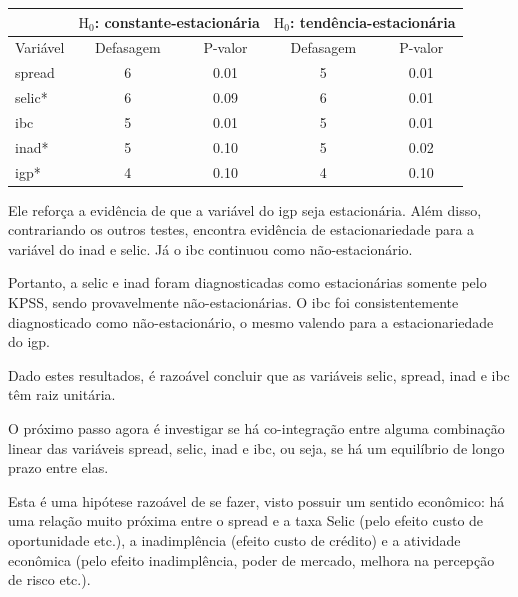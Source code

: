 \documentclass[a4paper,
               article,
               12pt,
               openany,
               oneside,
               english,
               brazil]{abntex2}
\numberwithin{equation}{section}
\begin{document}
    \begin{table}[ht]
        {%
            \begin{tabular}{lcccc}
                \midrule
                & \multicolumn{2}{C{5cm}}{$ \text{H}_0 $: constante-estacionária} & \multicolumn{2}{C{5cm}}{$ \text{H}_0 $: tendência-estacionária} \\
                \midrule
                Variável & Defasagem & P-valor & Defasagem & P-valor \\
                \midrule
                spread     &          6 &     0.01 &          5 &     0.01 \\
                selic*      &          6 &     0.09 &          6 &     0.01 \\
                ibc        &          5 &     0.01 &          5 &     0.01 \\
                inad*       &          5 &     0.10 &          5 &     0.02 \\
                igp*        &          4 &     0.10 &          4 &     0.10 \\
                \midrule
            \end{tabular}
            } 
            {}
    \end{table}

    Ele reforça a evidência de que a variável do igp seja estacionária. Além disso, contrariando os outros testes, encontra evidência de estacionariedade para a variável do inad e selic. Já o ibc continuou como não-estacionário.

    Portanto, a selic e inad foram diagnosticadas como estacionárias somente pelo KPSS\@, sendo provavelmente não-estacionárias. O ibc foi consistentemente diagnosticado como não-estacionário, o mesmo valendo para a estacionariedade do igp.

    Dado estes resultados, é razoável concluir que as variáveis selic, spread, inad e ibc têm raiz unitária. 
    
    O próximo passo agora é investigar se há co-integração entre alguma combinação linear das variáveis spread, selic, inad e ibc, ou seja, se há um equilíbrio de longo prazo entre elas.
    
    Esta é uma hipótese razoável de se fazer, visto possuir um sentido econômico: há uma relação muito próxima entre o spread e a taxa Selic (pelo efeito custo de oportunidade etc.), a inadimplência (efeito custo de crédito) e a atividade econômica (pelo efeito inadimplência, poder de mercado, melhora na percepção de risco etc.).
\end{document}

